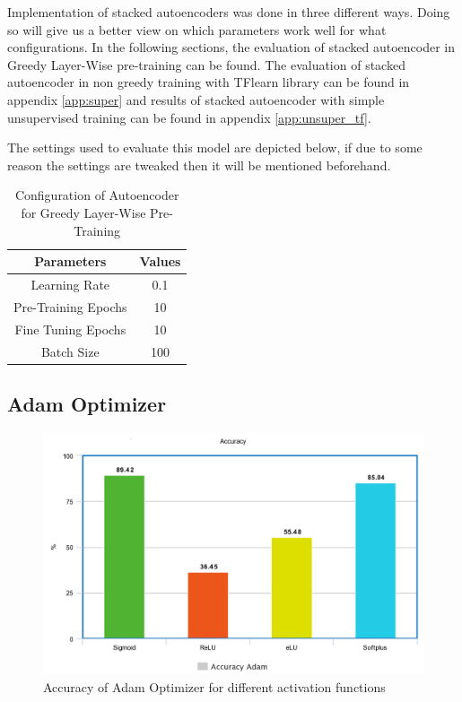 \documentclass[12pt, a4paper]{report}
\begin{document}
Implementation of stacked autoencoders was done in three different ways. Doing so will give us a better view on which parameters work well for what configurations. In the following sections, the evaluation of stacked autoencoder in Greedy Layer-Wise pre-training can be found. The evaluation of stacked autoencoder in non greedy training with TFlearn library can be found in appendix \ref{app:super} and results of stacked autoencoder with simple unsupervised training can be found in appendix \ref{app:unsuper_tf}.

\clearpage
The settings used to evaluate this model are depicted below, if due to some reason the settings are tweaked then it will be mentioned beforehand.\\ 

\begin{table}[ht]
\centering
\begin{tabular}{|c|c|}
\hline
\textbf{Parameters} & \textbf{Values} \\ \hline
Learning Rate       & 0.1             \\ \hline
Pre-Training Epochs & 10              \\ \hline
Fine Tuning Epochs  & 10              \\ \hline
Batch Size          & 100             \\ \hline
\end{tabular}
\caption{Configuration of Autoencoder for Greedy Layer-Wise Pre-Training}
\label{config_auto_greedy}
\end{table}

\subsection {Adam Optimizer}
\begin{figure}[ht]
\centering
\captionsetup{justification=centering,margin=2cm}
\includegraphics[width=13cm]{adam_accuracy_greedy.png}
\caption{ Accuracy of Adam Optimizer for different activation functions}
\label{fig:accuracy_adam_greedy}
\end{figure}
\end{document}
